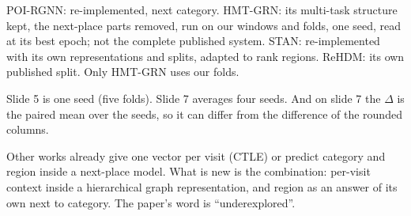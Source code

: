 POI-RGNN: re-implemented, next category. HMT-GRN: its multi-task structure kept, the next-place parts
removed, run on our windows and folds, one seed, read at its best epoch; not the complete published
system. STAN: re-implemented with its own representations and splits, adapted to rank regions. ReHDM:
its own published split. Only HMT-GRN uses our folds.

Slide 5 is one seed (five folds). Slide 7 averages four seeds. And on slide 7 the $\Delta$ is the
paired mean over the seeds, so it can differ from the difference of the rounded columns.

Other works already give one vector per visit (CTLE) or predict category and region inside a
next-place model. What is new is the combination: per-visit context inside a hierarchical graph
representation, and region as an answer of its own next to category. The paper's word is
``underexplored''.

